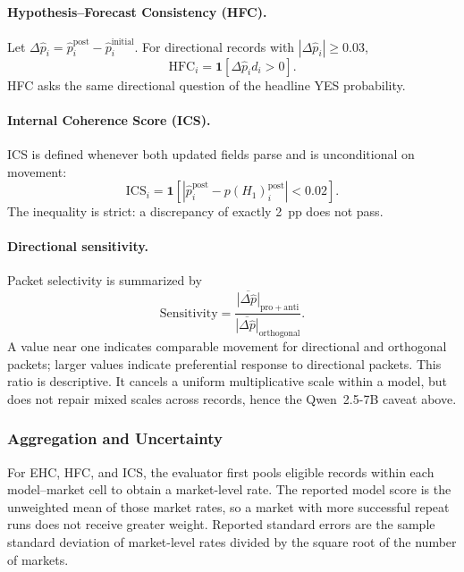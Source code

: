 \paragraph{Hypothesis--Forecast Consistency (HFC).}
Let \(\Delta\hat p_i=\hat p_i^{\mathrm{post}}-\hat p_i^{\mathrm{initial}}\).
For directional records with \(|\Delta\hat p_i|\geq0.03\),
\begin{equation}
  \mathrm{HFC}_i=\mathbf{1}\!\left[\Delta\hat p_i d_i>0\right].
  \label{eq:hfc}
\end{equation}
HFC asks the same directional question of the headline YES probability.

\paragraph{Internal Coherence Score (ICS).}
ICS is defined whenever both updated fields parse and is unconditional on movement:
\begin{equation}
  \mathrm{ICS}_i=\mathbf{1}\!\left[
  \left|\hat p_i^{\mathrm{post}}-p(H_1)_i^{\mathrm{post}}\right|<0.02\right].
  \label{eq:ics}
\end{equation}
The inequality is strict: a discrepancy of exactly 2~pp does not pass.

\paragraph{Directional sensitivity.}
Packet selectivity is summarized by
\begin{equation}
  \mathrm{Sensitivity}=
  \frac{\overline{|\Delta\hat p|}_{\mathrm{pro}+\mathrm{anti}}}
       {\overline{|\Delta\hat p|}_{\mathrm{orthogonal}}}.
  \label{eq:sensitivity}
\end{equation}
A value near one indicates comparable movement for directional and orthogonal
packets; larger values indicate preferential response to directional packets. This
ratio is descriptive.  It cancels a uniform multiplicative scale within a model, but
does not repair mixed scales across records, hence the Qwen~2.5-7B caveat above.

\subsubsection{Aggregation and Uncertainty}
\label{app:aggregation}

For EHC, HFC, and ICS, the evaluator first pools eligible records within each
model--market cell to obtain a market-level rate.  The reported model score is the
unweighted mean of those market rates, so a market with more successful repeat runs
does not receive greater weight.  Reported standard errors are the sample standard
deviation of market-level rates divided by the square root of the number of markets.

